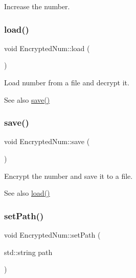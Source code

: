 Increase the number. 

\mbox{\label{class_encrypted_num_ab4591dbc5b9980f497f4de894a614447}} 
\subsubsection{\texorpdfstring{load()}{load()}}
{\footnotesize\ttfamily void Encrypted\+Num\+::load (\begin{DoxyParamCaption}{ }\end{DoxyParamCaption})\hspace{0.3cm}{\ttfamily [virtual]}}



Load number from a file and decrypt it. 

\begin{DoxySeeAlso}{See also}
\mbox{\hyperlink{class_encrypted_num_abd733c5a8b818c02cc00e1af57cbe76b}{save()}} 
\end{DoxySeeAlso}
\mbox{\label{class_encrypted_num_abd733c5a8b818c02cc00e1af57cbe76b}} 
\subsubsection{\texorpdfstring{save()}{save()}}
{\footnotesize\ttfamily void Encrypted\+Num\+::save (\begin{DoxyParamCaption}{ }\end{DoxyParamCaption})\hspace{0.3cm}{\ttfamily [virtual]}}



Encrypt the number and save it to a file. 

\begin{DoxySeeAlso}{See also}
\mbox{\hyperlink{class_encrypted_num_ab4591dbc5b9980f497f4de894a614447}{load()}} 
\end{DoxySeeAlso}
\mbox{\label{class_encrypted_num_a27cca0eb4cf9f19035741be2a56d96a7}} 
\subsubsection{\texorpdfstring{set\+Path()}{setPath()}}
{\footnotesize\ttfamily void Encrypted\+Num\+::set\+Path (\begin{DoxyParamCaption}\item[{std\+::string}]{path }\end{DoxyParamCaption})\hspace{0.3cm}{\ttfamily [virtual]}}




